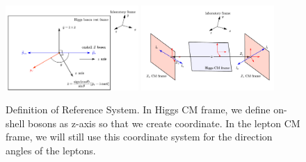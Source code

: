 \documentclass{article}
\begin{document}
  \begin{figure}[htb]     
    \centering
     \includegraphics[width=0.45\textwidth]{figure/figure0_reference.pdf}%
     \includegraphics[width=0.45\textwidth]{figure/figure0_frame.pdf}%
     \caption{Definition of Reference System. In Higgs CM frame, we define on-shell bosons as z-axis so that we create coordinate. In the lepton CM frame, we will still use this coordinate system for the direction angles of the leptons. }%
     \label{fig:frame}
 \end{figure}
 
\end{document}
